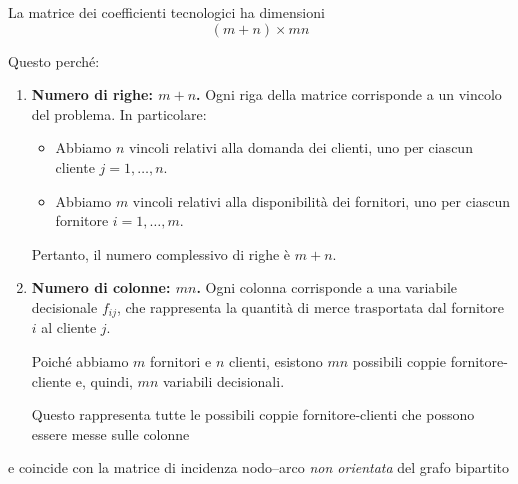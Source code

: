\begin{center}
\begin{minipage}{\linewidth}
\centering
\captionsetup{hypcap=false}
\label{fig:trasporto-generico}
\end{minipage}
\end{center}

La matrice dei coefficienti tecnologici ha dimensioni
\[
(m+n)\times mn
\]
\begin{warning}{}
    Questo perché:
    \begin{enumerate}
        \item \textbf{Numero di righe: $m+n$.}
        Ogni riga della matrice corrisponde a un vincolo del problema.
        In particolare:
        \begin{itemize}
            \item Abbiamo $n$ vincoli relativi alla domanda dei clienti, uno per ciascun cliente $j=1,\dots,n$.
            \item Abbiamo $m$ vincoli relativi alla disponibilità dei fornitori, uno per ciascun fornitore $i=1,\dots,m$.
        \end{itemize}
        Pertanto, il numero complessivo di righe è $m+n$.

        \item \textbf{Numero di colonne: $mn$.}
        Ogni colonna corrisponde a una variabile decisionale $f_{ij}$, che rappresenta la quantità di merce trasportata dal fornitore $i$ al cliente $j$.

        Poiché abbiamo $m$ fornitori e $n$ clienti, esistono $mn$ possibili coppie fornitore-cliente e, quindi, $mn$ variabili decisionali.

        Questo rappresenta tutte le possibili coppie fornitore-clienti che possono essere messe sulle colonne
    \end{enumerate}
\end{warning}
e coincide con la matrice di incidenza nodo--arco \emph{non orientata}
del grafo bipartito

